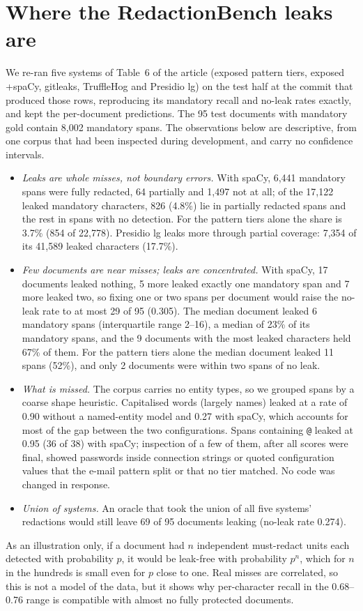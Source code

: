 \documentclass[11pt,a4paper]{article}
\begin{document}
\section{Where the RedactionBench leaks are}\label{s:leaks}

We re-ran five systems of Table~6 of the article (exposed pattern tiers, exposed +spaCy, gitleaks, TruffleHog and Presidio lg) on the test half at the commit that produced those rows, reproducing its mandatory recall and no-leak rates exactly, and kept the per-document predictions. The 95 test documents with mandatory gold contain 8{,}002 mandatory spans. The observations below are descriptive, from one corpus that had been inspected during development, and carry no confidence intervals.
\begin{itemize}
\item \emph{Leaks are whole misses, not boundary errors.} With spaCy, 6{,}441 mandatory spans were fully redacted, 64 partially and 1{,}497 not at all; of the 17{,}122 leaked mandatory characters, 826 (4.8\%) lie in partially redacted spans and the rest in spans with no detection. For the pattern tiers alone the share is 3.7\% (854 of 22{,}778). Presidio lg leaks more through partial coverage: 7{,}354 of its 41{,}589 leaked characters (17.7\%).
\item \emph{Few documents are near misses; leaks are concentrated.} With spaCy, 17 documents leaked nothing, 5 more leaked exactly one mandatory span and 7 more leaked two, so fixing one or two spans per document would raise the no-leak rate to at most 29 of 95 (0.305). The median document leaked 6 mandatory spans (interquartile range 2--16), a median of 23\% of its mandatory spans, and the 9 documents with the most leaked characters held 67\% of them. For the pattern tiers alone the median document leaked 11 spans (52\%), and only 2 documents were within two spans of no leak.
\item \emph{What is missed.} The corpus carries no entity types, so we grouped spans by a coarse shape heuristic. Capitalised words (largely names) leaked at a rate of 0.90 without a named-entity model and 0.27 with spaCy, which accounts for most of the gap between the two configurations. Spans containing \texttt{@} leaked at 0.95 (36 of 38) with spaCy; inspection of a few of them, after all scores were final, showed passwords inside connection strings or quoted configuration values that the e-mail pattern split or that no tier matched. No code was changed in response.
\item \emph{Union of systems.} An oracle that took the union of all five systems' redactions would still leave 69 of 95 documents leaking (no-leak rate 0.274).
\end{itemize}
As an illustration only, if a document had $n$ independent must-redact units each detected with probability $p$, it would be leak-free with probability $p^{n}$, which for $n$ in the hundreds is small even for $p$ close to one. Real misses are correlated, so this is not a model of the data, but it shows why per-character recall in the 0.68--0.76 range is compatible with almost no fully protected documents.
\end{document}
